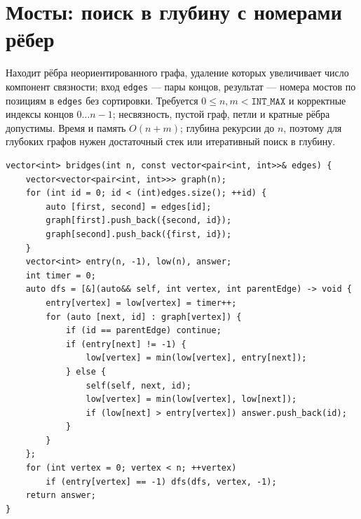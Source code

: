 \section{Мосты: поиск в глубину с номерами рёбер}
Находит рёбра неориентированного графа, удаление которых увеличивает число компонент связности; вход \texttt{edges} --- пары концов, результат --- номера мостов по позициям в \texttt{edges} без сортировки.
Требуется $0\le n,m<\texttt{INT\_MAX}$ и корректные индексы концов $0\ldots n-1$; несвязность, пустой граф, петли и кратные рёбра допустимы.
Время и память $O(n+m)$; глубина рекурсии до $n$, поэтому для глубоких графов нужен достаточный стек или итеративный поиск в глубину.
\begin{lstlisting}[name=graphs_bridges]
vector<int> bridges(int n, const vector<pair<int, int>>& edges) {
    vector<vector<pair<int, int>>> graph(n);
    for (int id = 0; id < (int)edges.size(); ++id) {
        auto [first, second] = edges[id];
        graph[first].push_back({second, id});
        graph[second].push_back({first, id});
    }
    vector<int> entry(n, -1), low(n), answer;
    int timer = 0;
    auto dfs = [&](auto&& self, int vertex, int parentEdge) -> void {
        entry[vertex] = low[vertex] = timer++;
        for (auto [next, id] : graph[vertex]) {
            if (id == parentEdge) continue;
            if (entry[next] != -1) {
                low[vertex] = min(low[vertex], entry[next]);
            } else {
                self(self, next, id);
                low[vertex] = min(low[vertex], low[next]);
                if (low[next] > entry[vertex]) answer.push_back(id);
            }
        }
    };
    for (int vertex = 0; vertex < n; ++vertex)
        if (entry[vertex] == -1) dfs(dfs, vertex, -1);
    return answer;
}
\end{lstlisting}
%

